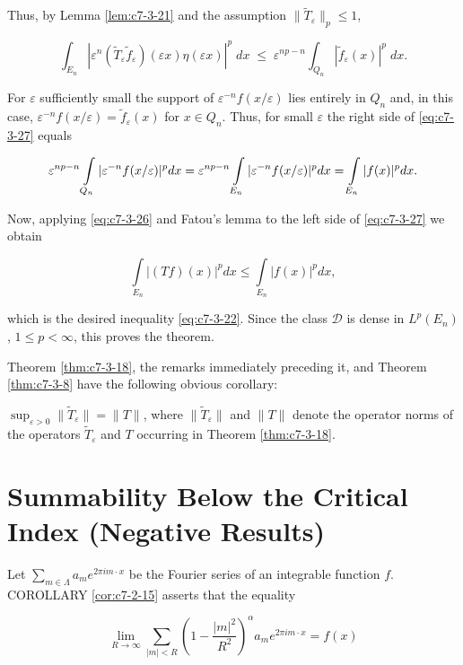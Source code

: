 Thus, by Lemma \ref{lem:c7-3-21} and the assumption $\|\tilde{T}_{\varepsilon}\|_{p} \leq 1$,

\begin{equation}\label{eq:c7-3-27}
\int_{{E}_{n}}|\varepsilon^{n}(\widetilde{T}_{\varepsilon}\widetilde{f}_{\varepsilon})(\varepsilon x)\eta(\varepsilon x)|^{p}\;{d}x\;\leq\;\varepsilon^{n p-n}\int_{{Q}_{n}}|\widetilde{f}_{\varepsilon}(x)|^{p}\;{d}x.
\end{equation}

For $\varepsilon$ sufficiently small the support of $\varepsilon^{-n}f(x/\varepsilon)$ lies entirely in $Q_n$ and, in this case, $\varepsilon^{-n}f(x/\varepsilon) = \tilde{f}_{\varepsilon}(x)$ for $x \in Q_n$. Thus, for small $\varepsilon$ the right side of \eqref{eq:c7-3-27} equals

\[
\varepsilon^{n p-n}\intop_{Q_{n}}|\varepsilon^{-n}f(x/\varepsilon)|^{p}d x=\varepsilon^{n p-n}\intop_{E_{n}}|\varepsilon^{-n}f(x/\varepsilon)|^{p}d x=\intop_{E_{n}}|f(x)|^{p}d x.
\]

Now, applying \eqref{eq:c7-3-26} and Fatou's lemma to the left side of \eqref{eq:c7-3-27} we obtain

\[
\int\limits_{E_{n}}\left|(T f)(x)\right|^{p}d x\leq\int\limits_{E_{n}}\left|f(x)\right|^{p}d x,
\]

which is the desired inequality \eqref{eq:c7-3-22}. Since the class $\mathcal{D}$ is dense in $L^p(E_n)$, $1 \leq p < \infty$, this proves the theorem.

Theorem \ref{thm:c7-3-18}, the remarks immediately preceding it, and Theorem \ref{thm:c7-3-8} have the following obvious corollary:

\begin{corollary}
\label{cor:c7-3-28}
$\sup_{\varepsilon>0} \|\tilde{T}_\varepsilon\| = \|T\|$, where $\|\tilde{T}_\varepsilon\|$ and $\|T\|$ denote the operator norms of the operators $\tilde{T}_\varepsilon$ and $T$ occurring in Theorem \ref{thm:c7-3-18}.
\end{corollary}

\section{Summability Below the Critical Index (Negative Results)}

Let $\sum_{m \in \Lambda} a_m e^{2\pi i m \cdot x}$ be the Fourier series of an integrable function $f$. COROLLARY \eqref{cor:c7-2-15} asserts that the equality

\begin{equation}\label{eq:c7-4-1}
\lim_{R\to\infty}\sum_{|m|<R}\left(1-\frac{|m|^{2}}{R^{2}}\right)^\alpha a_{m} e^{2\pi i m\cdot x}=f(x)
\end{equation}

